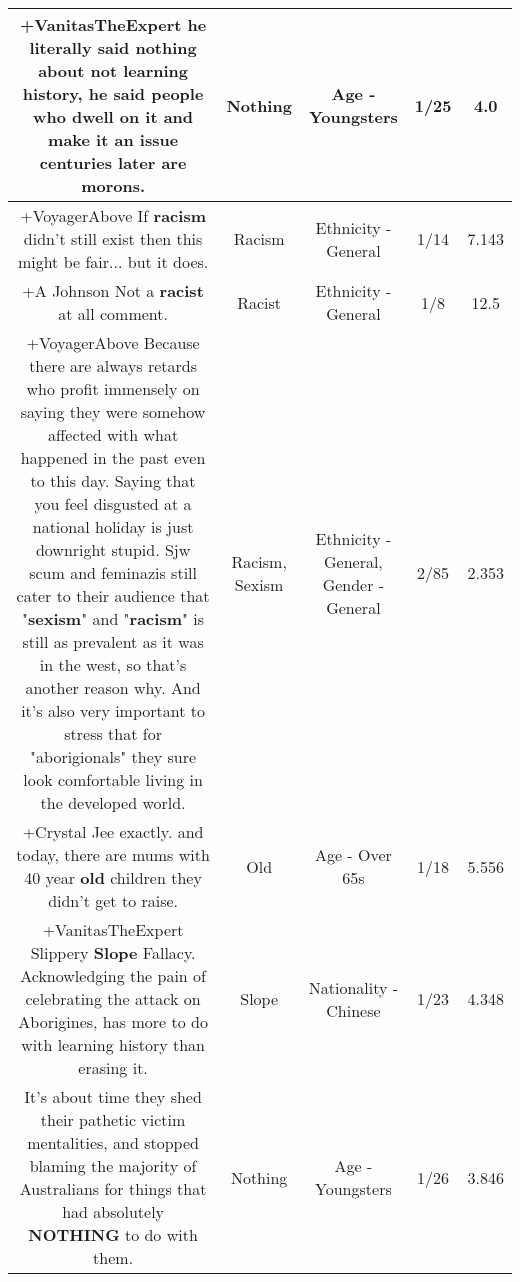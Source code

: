 \documentclass[11pt]{article}
\newlength\mylength
\begin{document}
\begin{center}
\begin{longtable}{|C{.65\mylength}|C{.30\mylength}|C{.12\mylength}|C{.12\mylength}|C{.12\mylength}|}
  \small +VanitasTheExpert he literally said \textbf{nothing} about not learning history, he said people who dwell on it and make it an issue centuries later are morons.\normalsize   & Nothing & Age - Youngsters & 1/25 & 4.0 \\  \hline
  \small +VoyagerAbove If \textbf{racism} didn't still exist then this might be fair... but it does.\normalsize   & Racism & Ethnicity - General & 1/14 & 7.143 \\  \hline
  \small +A Johnson Not a \textbf{racist} at all comment.\normalsize   & Racist & Ethnicity - General & 1/8 & 12.5 \\  \hline
  \small +VoyagerAbove Because there are always retards who profit immensely on saying they were somehow affected with what happened in the past even to this day. Saying that you feel disgusted at a national holiday is just downright stupid. Sjw scum and feminazis still cater to their audience that "\textbf{sexism}" and "\textbf{racism}" is still as prevalent as it was in the west, so that's another reason why. And it's also very important to stress that for "aborigionals" they sure look comfortable living in the developed world.\normalsize   & Racism, Sexism & Ethnicity - General, Gender - General & 2/85 & 2.353 \\  \hline
  \small +Crystal Jee exactly. and today, there are mums with 40 year \textbf{old} children they didn't get to raise.\normalsize   & Old & Age - Over 65s & 1/18 & 5.556 \\  \hline
  \small +VanitasTheExpert Slippery \textbf{Slope} Fallacy. Acknowledging the pain of celebrating the attack on Aborigines, has more to do with learning history than erasing it.\normalsize   & Slope & Nationality - Chinese & 1/23 & 4.348 \\  \hline
  \small It's about time they shed their pathetic victim mentalities, and stopped blaming the majority of Australians for things that had absolutely \textbf{NOTHING} to do with them.\normalsize   & Nothing & Age - Youngsters & 1/26 & 3.846 \\  \hline

\end{longtable}
\end{center}
\end{document}
